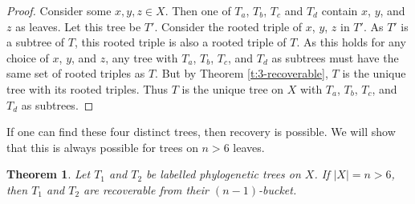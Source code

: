 \documentclass[12pt]{article}
\newtheorem{Theorem}{Theorem}[section]
\theoremstyle{definition}
\begin{document}
\begin{proof}
    Consider some $x, y, z \in X$. Then one of $T_a$, $T_b$, $T_c$ and $T_d$ contain $x$, $y$, and $z$ as leaves. Let this tree be $T'$. Consider the rooted triple of $x$, $y$, $z$ in $T'$. As $T'$ is a subtree of $T$, this rooted triple is also a rooted triple of $T$. As this holds for any choice of $x$, $y$, and $z$, any tree with $T_a$, $T_b$, $T_c$, and $T_d$ as subtrees must have the same set of rooted triples as $T$. But by Theorem \ref{t:3-recoverable}, $T$ is the unique tree with its rooted triples. Thus $T$ is the unique tree on $X$ with $T_a$, $T_b$, $T_c$, and $T_d$ as subtrees.
\end{proof}

If one can find these four distinct trees, then recovery is possible. We will show that this is always possible for trees on $n > 6$ leaves.

\begin{Theorem}
    Let $T_1$ and $T_2$ be labelled phylogenetic trees on $X$. If $|X| = n > 6$, then $T_1$ and $T_2$ are recoverable from their $(n-1)$-bucket.
\end{Theorem}
\end{document}
